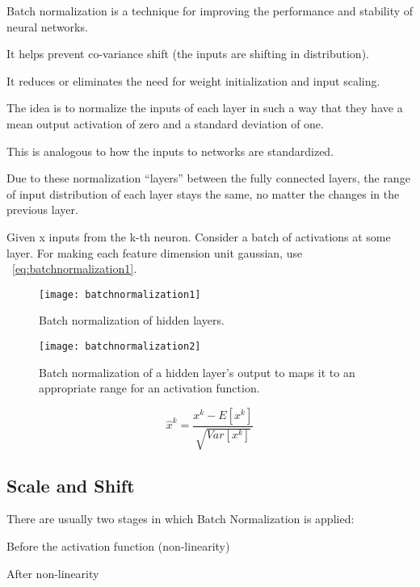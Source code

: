 	\begin{bulletedlist}
		\item Batch normalization is a technique for improving the performance and stability of neural networks.
		\item It helps prevent co-variance shift (the inputs are shifting in distribution).
		\item It reduces or eliminates the need for weight initialization and input scaling.
		\item The idea is to normalize the inputs of each layer in such a way that they have a mean output activation of zero and a standard deviation of one.
		\item This is analogous to how the inputs to networks are standardized.
		\item Due to these normalization ``layers'' between the fully connected layers, the range of input distribution of each layer stays the same, no matter the changes in the previous layer.
		\item Given x inputs from the k-th neuron. Consider a batch of activations at some layer. For making each feature dimension unit gaussian, use \equationname~\ref{eq:batchnormalization1}.
	\end{bulletedlist}

 	\begin{figure}[h]
		\centering
		\texttt{[image: batchnormalization1]}
		\caption[Batch normalization of hidden layers]{Batch normalization of hidden layers.}
		\label{fig:batchnormalization1}
	\end{figure}
 	\begin{figure}[h]
		\centering
		\texttt{[image: batchnormalization2]}
		\caption[Batch normalization and activation functions]{Batch normalization of a hidden layer's output to maps it to an appropriate range for an activation function.}
		\label{fig:batchnormalization2}
	\end{figure}

	\begin{equation}
		\hat{x}^k = \frac{x^k - E\left[x^k \right]}{\sqrt{Var\left[x^k \right]}}
		\label{eq:batchnormalization1}
	\end{equation}

	\subsection{Scale and Shift}
There are usually two stages in which Batch Normalization is applied:
	\begin{numberedlist}
		\item Before the activation function (non-linearity)
		\item After non-linearity
	\end{numberedlist}

